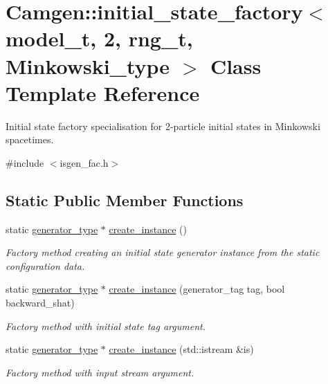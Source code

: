 \hypertarget{a00307}{\section{Camgen\-:\-:initial\-\_\-state\-\_\-factory$<$ model\-\_\-t, 2, rng\-\_\-t, Minkowski\-\_\-type $>$ Class Template Reference}
\label{a00307}
}


Initial state factory specialisation for 2-\/particle initial states in Minkowski spacetimes.  




{\ttfamily \#include $<$isgen\-\_\-fac.\-h$>$}

\subsection*{Static Public Member Functions}
\begin{DoxyCompactItemize}
\item 
static \hyperlink{a00304}{generator\-\_\-type} $\ast$ \hyperlink{a00307_a80f3b6cec09ba839f84643a374580e0f}{create\-\_\-instance} ()
\begin{DoxyCompactList}\small\item\em Factory method creating an initial state generator instance from the static configuration data. \end{DoxyCompactList}\item 
\hypertarget{a00307_af52b614b9809aba51ad3d6895a77d755}{static \hyperlink{a00304}{generator\-\_\-type} $\ast$ \hyperlink{a00307_af52b614b9809aba51ad3d6895a77d755}{create\-\_\-instance} (generator\-\_\-tag tag, bool backward\-\_\-shat)}\label{a00307_af52b614b9809aba51ad3d6895a77d755}

\begin{DoxyCompactList}\small\item\em Factory method with initial state tag argument. \end{DoxyCompactList}\item 
\hypertarget{a00307_aebde8240f947a47ea4cc4a1ac4208667}{static \hyperlink{a00304}{generator\-\_\-type} $\ast$ \hyperlink{a00307_aebde8240f947a47ea4cc4a1ac4208667}{create\-\_\-instance} (std\-::istream \&is)}\label{a00307_aebde8240f947a47ea4cc4a1ac4208667}

\begin{DoxyCompactList}\small\item\em Factory method with input stream argument. \end{DoxyCompactList}\end{DoxyCompactItemize}


